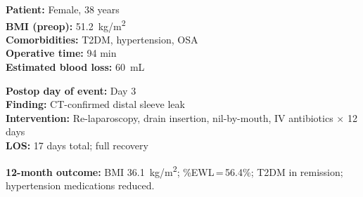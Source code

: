 \documentclass[11pt,a4paper]{article}
\begin{document}
\begin{tcolorbox}[casebox, title={\faUser\enspace Case 1\enspace\textendash\enspace
  Grade IIIb Complication: Staple-Line Leak}]
\small
\begin{minipage}[t]{0.48\linewidth}
  \textbf{\color{SurgBlue}Patient:} Female, 38 years\\
  \textbf{\color{SurgBlue}BMI (preop):} 51.2~kg/m\textsuperscript{2}\\
  \textbf{\color{SurgBlue}Comorbidities:} T2DM, hypertension, OSA\\
  \textbf{\color{SurgBlue}Operative time:} 94 min\\
  \textbf{\color{SurgBlue}Estimated blood loss:} 60~mL
\end{minipage}%
\hfill%
\begin{minipage}[t]{0.48\linewidth}
  \textbf{\color{SurgBlue}Postop day of event:} Day 3\\
  \textbf{\color{SurgBlue}Finding:} CT-confirmed distal sleeve leak\\
  \textbf{\color{SurgBlue}Intervention:} Re-laparoscopy, drain insertion,
    nil-by-mouth, IV antibiotics $\times$ 12 days\\
  \textbf{\color{SurgBlue}LOS:} 17 days total; full recovery
\end{minipage}

\vspace{6pt}
\textbf{\color{SurgTeal}12-month outcome:} BMI 36.1~kg/m\textsuperscript{2};
\%EWL\,=\,56.4\%; T2DM in remission; hypertension medications reduced.
\end{tcolorbox}

\vspace{6pt}
\end{document}
